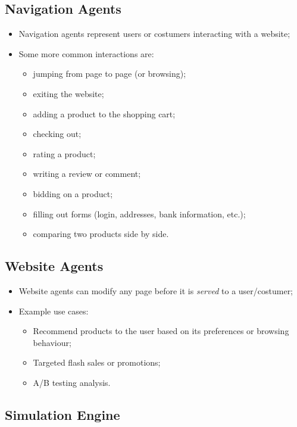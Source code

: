 \subsection{Navigation Agents}

\begin{itemize}
    \item Navigation agents represent users or costumers interacting with a 
    website;
    \item Some more common interactions are:
    \begin{itemize}
        \item jumping from page to page (or browsing);
        \item exiting the website;
        \item adding a product to the shopping cart;
        \item checking out;
        \item rating a product;
        \item writing a review or comment;
        \item bidding on a product;
        \item filling out forms (login, addresses, bank information, etc.);
        \item comparing two products side by side.
    \end{itemize}
\end{itemize}

\subsection{Website Agents}

\begin{itemize}
    \item Website agents can modify any page before it is \textit{served} to a 
    user/costumer;
    \item Example use cases:
    \begin{itemize}
        \item Recommend products to the user based on its preferences or 
        browsing behaviour;
        \item Targeted flash sales or promotions;
        \item A/B testing analysis.
    \end{itemize}
\end{itemize}

\subsection{Simulation Engine}

